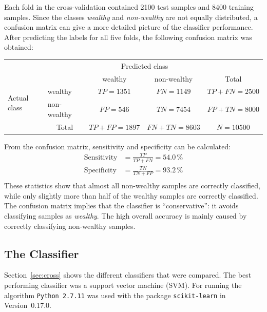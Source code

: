 \documentclass[a4paper,11pt]{article}
\begin{document}
Each fold in the cross-validation contained 2100 test samples and 8400
training samples. Since the classes \emph{wealthy} and
\emph{non-wealthy} are not equally distributed, a confusion matrix can
give a more detailed picture of the classifier performance. After
predicting the labels for all five folds, the following confusion
matrix was obtained:

\begin{table}[h]
\centering
\begin{tabular}{l|l|c|c|c}
\multicolumn{2}{c}{}&\multicolumn{2}{c}{Predicted class}&\\
\cline{3-4}
\multicolumn{2}{c|}{}&wealthy & non-wealthy &\multicolumn{1}{c}{Total}\\
\cline{2-4}
\multirow{2}{*}{Actual class}& wealthy & $TP = 1351$ & $FN = 1149$ & $TP+FN = 2500$\\
\cline{2-4}
& non-wealthy & $FP = 546$ & $TN = 7454$ & $FP+TN = 8000$\\
\cline{2-4}
\multicolumn{1}{c}{} & \multicolumn{1}{c}{Total} & \multicolumn{1}{c}{$TP+FP=1897$} & \multicolumn{1}{c}{$FN+TN = 8603$} & \multicolumn{1}{c}{$N = 10500$}\\
\end{tabular}
\end{table}
From the confusion matrix, sensitivity and specificity can be calculated:
\begin{align}
\text{Sensitivity} &= \frac{TP}{TP + FN} = 54.0\,\%\\
\text{Specificity}    &= \frac{TN}{TN + FP} = 93.2\,\%\\
\end{align}
These statistics show that almost all non-wealthy samples are
correctly classified, while only slightly more than half of the
wealthy samples are correctly classified. The confusion matrix implies
that the classifier is ``conservative'': it avoids classifying samples
as \emph{wealthy}. The high overall accuracy is mainly caused by
correctly classifying non-wealthy samples.

\subsection{The Classifier}

Section~\ref{sec:cross} shows the different classifiers that were
compared. The best performing classifier was a support vector machine
(SVM). For running the algorithm \texttt{Python~2.7.11} was used with
the package \texttt{scikit-learn} in Version~0.17.0.
\end{document}
